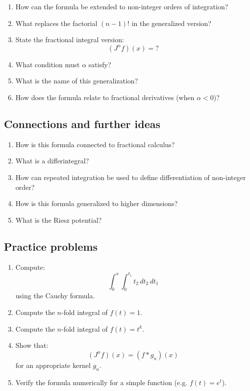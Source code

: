 \begin{enumerate}[resume]
  \item How can the formula be extended to non-integer orders of integration?
  \item What replaces the factorial $(n-1)!$ in the generalized version?
  \item State the fractional integral version:
    \[
      (J^\alpha f)(x) = ?
    \]
  \item What condition must $\alpha$ satisfy?
  \item What is the name of this generalization?
  \item How does the formula relate to fractional derivatives (when $\alpha < 0$)?
\end{enumerate}

\subsection{Connections and further ideas}

\begin{enumerate}[resume]
  \item How is this formula connected to fractional calculus?
  \item What is a differintegral?
  \item How can repeated integration be used to define differentiation of non-integer order?
  \item How is this formula generalized to higher dimensions?
  \item What is the Riesz potential?
\end{enumerate}

\subsection{Practice problems}

\begin{enumerate}[resume]
  \item Compute:
    \[
      \int_0^x \int_0^{t_1} t_2 \, dt_2 \, dt_1
    \]
    using the Cauchy formula.
  \item Compute the $n$-fold integral of $f(t) = 1$.
  \item Compute the $n$-fold integral of $f(t) = t^k$.
  \item Show that:
    \[
      (J^n f)(x) = (f * g_n)(x)
    \]
    for an appropriate kernel $g_n$.
  \item Verify the formula numerically for a simple function (e.g. $f(t)=e^t$).
\end{enumerate}
